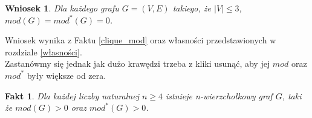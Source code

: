 \documentclass[letterpaper,12pt]{article}
\newtheorem{fact}{Fakt}
\newtheorem{conclusion}{Wniosek}
\begin{document}
\begin{conclusion}
  Dla każdego grafu \(G=(V, E)\) takiego, że \(|V| \leq 3\), \(mod(G) = mod^*(G) = 0\).\\
\end{conclusion}
Wniosek wynika z Faktu \ref{clique_mod} oraz własności przedstawionych w rozdziale \ref{własności}.\\

Zastanówmy się jednak jak dużo krawędzi trzeba z kliki usunąć, aby jej \(mod\) oraz \(mod^*\) były większe od zera.\\

\begin{fact}
  Dla każdej liczby naturalnej \(n \geq 4\) istnieje n-wierzchołkowy graf \(G\), taki że \(mod(G) > 0\) oraz \(mod^*(G) > 0\).\\
\end{fact}
\end{document}
